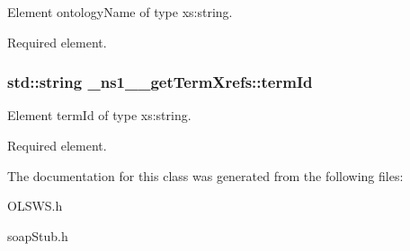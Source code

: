 Element ontologyName of type xs:string. 

Required element. \hypertarget{class__ns1____getTermXrefs_a1ed9316fbb9681fdcb716e631489b9a2}{
\subsubsection[{termId}]{\setlength{\rightskip}{0pt plus 5cm}std::string {\bf \_\-ns1\_\-\_\-getTermXrefs::termId}}}
\label{class__ns1____getTermXrefs_a1ed9316fbb9681fdcb716e631489b9a2}


Element termId of type xs:string. 

Required element. 

The documentation for this class was generated from the following files:\begin{DoxyCompactItemize}
\item 
OLSWS.h\item 
soapStub.h\end{DoxyCompactItemize}
